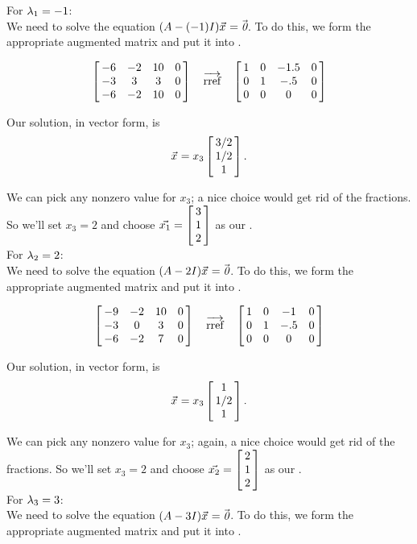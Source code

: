 {For $\lda_1 = -1$:\\

We need to solve the equation $(\tta - (-1)\tti)\vx = \zero$. To do this, we form the appropriate augmented matrix and put it into \rref.

$$\bmx{cccc} -6 & -2 & 10 &0\\ -3 & 3 & 3 & 0  \\ -6 & -2 & 10 & 0 \emx \quad \overrightarrow{\text{rref}} \quad \bmx{cccc} 1&0&-1.5&0\\0&1&-.5&0\\0&0&0&0\emx$$

Our solution, in vector form, is $$\vx = x_3\bmx{c} 3/2\\1/2\\1\emx.$$

We can pick any nonzero value for $x_3$; a nice choice would get rid of the fractions. So we'll set $x_3 = 2$ and choose $\vx[1]=\bmx{c} 3\\1\\2\emx$ as our \ev.\\

For $\lda_2 = 2$:\\

We need to solve the equation $(\tta - 2\tti)\vx = \zero$. To do this, we form the appropriate augmented matrix and put it into \rref.

$$\bmx{cccc} -9 & -2 & 10 &0\\ -3 & 0 & 3 & 0  \\ -6 & -2 & 7 & 0 \emx \quad \overrightarrow{\text{rref}} \quad \bmx{cccc} 1&0&-1&0\\0&1&-.5&0\\0&0&0&0\emx$$

Our solution, in vector form, is $$\vx = x_3\bmx{c} 1\\1/2\\1\emx.$$

We can pick any nonzero value for $x_3$; again, a nice choice would get rid of the fractions. So we'll set $x_3 = 2$ and choose $\vx[2]=\bmx{c} 2\\1\\2\emx$ as our \ev.\\

For $\lda_3 = 3$:\\



We need to solve the equation $(\tta - 3\tti)\vx = \zero$. To do this, we form the appropriate augmented matrix and put it into \rref.

}
